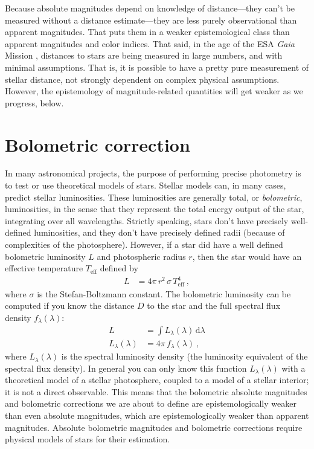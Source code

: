 \documentclass[10pt]{article}
\newcommand{\dd}{\mathrm{d}}
\newcommand{\eff}{\text{eff}}
\begin{document}
Because absolute magnitudes depend on knowledge of distance---they can't be measured without a distance estimate---they are less purely observational than apparent magnitudes.
That puts them in a weaker epistemological class than apparent magnitudes and color indices.
That said, in the age of the ESA \textsl{Gaia} Mission \cite{gaia}, distances to stars are being measured in large numbers, and with minimal assumptions.
That is, it is possible to have a pretty pure measurement of stellar distance, not strongly dependent on complex physical assumptions.
However, the epistemology of magnitude-related quantities will get weaker as we progress, below.

\section{Bolometric correction}\label{sec:bc}

In many astronomical projects, the purpose of performing precise photometry is to test or use theoretical models of stars.
Stellar models can, in many cases, predict stellar luminosities.
These luminosities are generally total, or \emph{bolometric}, luminosities, in the sense that they represent the total energy output of the star, integrating over all wavelengths.
Strictly speaking, stars don't have precisely well-defined luminosities, and they don't have precisely defined radii (because of complexities of the photosphere).
However, if a star did have a well defined bolometric luminosity $L$ and photospheric radius $r$, then the star would have an effective temperature $T_\eff$ defined by
\begin{align}
    L &= 4\pi\,r^2\,\sigma\,T_\eff^4 ~,
\end{align}
where $\sigma$ is the Stefan-Boltzmann constant.
The bolometric luminosity can be computed if you know the distance $D$ to the star and the full spectral flux density $f_\lambda(\lambda)$:
\begin{align}
    L &= \int L_\lambda(\lambda)\,\dd\lambda\label{eq:L}\\
    L_\lambda(\lambda) &= 4\pi\,f_\lambda(\lambda)\label{eq:L_lambda}~,
\end{align}
where $L_\lambda(\lambda)$ is the spectral luminosity density (the luminosity equivalent of the spectral flux density).
In general you can only know this function $L_\lambda(\lambda)$ with a theoretical model of a stellar photosphere, coupled to a model of a stellar interior; it is not a direct observable.
This means that the bolometric absolute magnitudes and bolometric corrections we are about to define are epistemologically weaker than even absolute magnitudes, which are epistemologically weaker than apparent magnitudes.
Absolute bolometric magnitudes and bolometric corrections require physical models of stars for their estimation.
\end{document}
